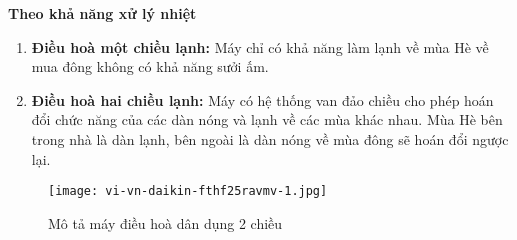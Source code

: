 	\textbf{Theo khả năng xử lý nhiệt}
	\begin{enumerate}[leftmargin=0.5cm]
		\setlength\itemsep{1mm}
		\item \textbf{Điều hoà một chiều lạnh:} Máy chỉ có khả năng làm lạnh về mùa Hè về mua đông không có khả năng sưởi ấm.
		
		\item \textbf{Điều hoà hai chiều lạnh:} Máy có hệ thống van đảo chiều cho phép hoán đổi chức năng của các dàn nóng và lạnh về các mùa khác nhau. Mùa Hè bên trong nhà là dàn lạnh, bên ngoài là dàn nóng về mùa đông sẽ hoán đổi ngược lại.
	\end{enumerate}
	
\begin{figure}[H]
	\centering
	\texttt{[image: vi-vn-daikin-fthf25ravmv-1.jpg]}
	\caption{Mô tả máy điều hoà dân dụng 2 chiều}
\end{figure}
	
